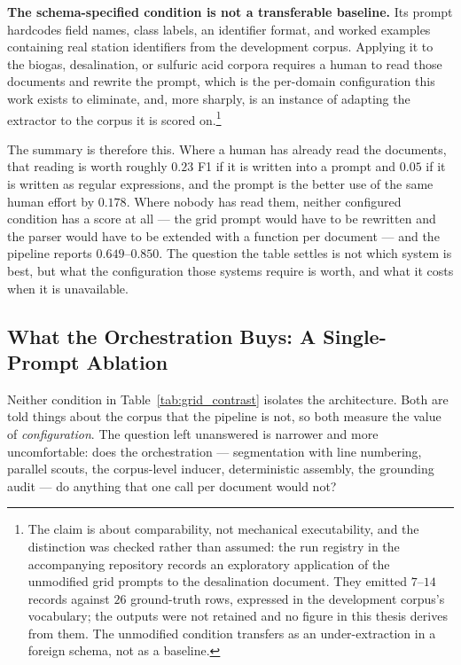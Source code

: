 \documentclass[11pt]{article}
\begin{document}
\textbf{The schema-specified condition is not a transferable baseline.} Its
prompt hardcodes field names, class labels, an identifier format, and worked
examples containing real station identifiers from the development corpus.
Applying it to the biogas, desalination, or sulfuric acid corpora requires a human to
read those documents and rewrite the prompt, which is the per-domain
configuration this work exists to eliminate, and, more sharply, is an instance of
adapting the extractor to the corpus it is scored on.\footnote{The claim is
about comparability, not mechanical executability, and the distinction was
checked rather than assumed: the run registry in the accompanying repository
records an exploratory application of the unmodified grid prompts to the
desalination document. They emitted $7$--$14$ records against $26$ ground-truth
rows, expressed in the development corpus's vocabulary; the outputs were not
retained and no figure in this thesis derives from them. The unmodified
condition transfers as an under-extraction in a foreign schema, not as a
baseline.}

The summary is therefore this. Where a human has already read the documents,
that reading is worth roughly $0.23$ F1 if it is written into a prompt and
$0.05$ if it is written as regular expressions, and the prompt is the better
use of the same human effort by $0.178$. Where nobody has read them, neither
configured condition has a score at all --- the grid prompt would have to be
rewritten and the parser would have to be extended with a function per document
--- and the pipeline reports $0.649$--$0.850$. The question the table settles is
not which system is best, but what the configuration those systems require is
worth, and what it costs when it is unavailable.

\subsection{What the Orchestration Buys: A Single-Prompt Ablation}
\label{sec:results_ablation}

Neither condition in Table~\ref{tab:grid_contrast} isolates the architecture.
Both are told things about the corpus that the pipeline is not, so both measure
the value of \emph{configuration}. The question left unanswered is narrower and
more uncomfortable: does the orchestration --- segmentation with line numbering,
parallel scouts, the corpus-level inducer, deterministic assembly, the grounding
audit --- do anything that one call per document would not?
\end{document}
